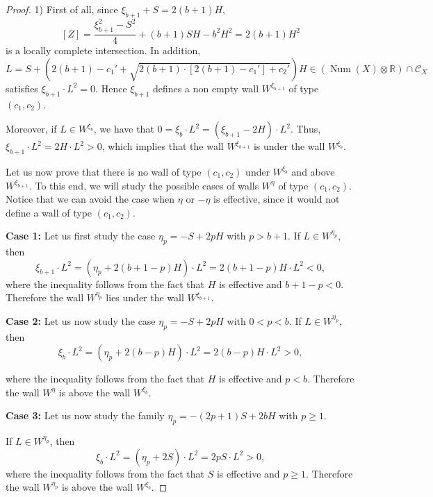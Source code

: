 \documentclass[11pt,twoside]{amsart}
\theoremstyle{definition}
\newcommand{\Num}{\operatorname{Num}}
\begin{document}
\begin{proof}
1) First of all, since
     $\xi_{b+1}+S=2(b+1)H$, 
         $$[Z]=\frac{{\xi^2_{b+1}}-S^2}{4}+(b+1)SH-b^2H^2=2(b+1)H^2$$ is a locally complete intersection.
In addition,  $$L= S+\left(2(b+1)-c_1'+\sqrt{2(b+1)\cdot[2(b+1)-c_1']+c_2'}\right)H\in (\Num(X)\otimes\mathbb{R})\cap \mathcal{C}_X$$ satisfies $\xi_{b+1}\cdot L^2=0$. Hence $\xi_{b+1}$ defines a non empty wall $W^{\xi_{b+1}}$ of type $(c_1,c_2)$.

    Moreover, if $L\in W^{\xi_b}$, we have that $0= \xi_{b}\cdot L^2=(\xi_{b+1}-2H)\cdot L^2$. Thus, $\xi_{b+1}\cdot L^2=2H\cdot L^2>0$, which implies that the wall $W^{\xi_{b+1}}$ is under the wall $W^{\xi_{b}}$.

   Let us now prove that there is no wall of type $(c_1,c_2)$ under $W^{\xi_b}$ and above $W^{\xi_{b+1}}$.
   To this end, we will study the possible cases of walls $W^{\eta}$ of type $(c_1,c_2)$.
   Notice that we can avoid the case when $\eta$ or $-\eta$ is effective, since it would not define a wall of type $(c_1,c_2)$.%

    

   \noindent\textbf{Case 1:}
   Let us first study the case $\eta_p= -S+2pH$ with $p>b+1$.
   If $L\in W^{\eta_p}$, then $$\xi_{b+1}\cdot L^2=(\eta_p+2(b+1-p)H)\cdot L^2=2(b+1-p)H\cdot L^2<0,$$
   where the inequality follows from the fact that $H$ is effective and $b+1-p<0$.
    Therefore the wall $W^{\eta_p}$ lies under the wall $W^{\xi_{b+1}}$.

    
   \noindent\textbf{Case 2:}
   Let us now study the case $\eta_p= -S+2pH$ with $0<p<b$.
   If $L\in W^{\eta_p}$, then $$\xi_b\cdot L^2=(\eta_p+2(b-p)H)\cdot L^2=2(b-p)H\cdot L^2>0,$$

  \noindent where the inequality follows from the fact that $H$ is effective and $p<b$.
    Therefore the wall $W^\eta$ is  above the wall $W^{\xi_{b}}$.

\noindent\textbf{Case 3:}
   Let us now study the family $\eta_{p}= -(2p+1)S+2bH$ with $p\geq1$.

   If $L\in W^{\eta_p}$, then $$\xi_b\cdot L^2=(\eta_p+2S)\cdot L^2= 2pS\cdot L^2>0,$$
\noindent   where the inequality follows from the fact that $S$ is effective and $p\geq1$.
    Therefore the wall $W^{\eta_p}$ is  above the wall $W^{\xi_{b}}$.


\end{proof}
\end{document}
